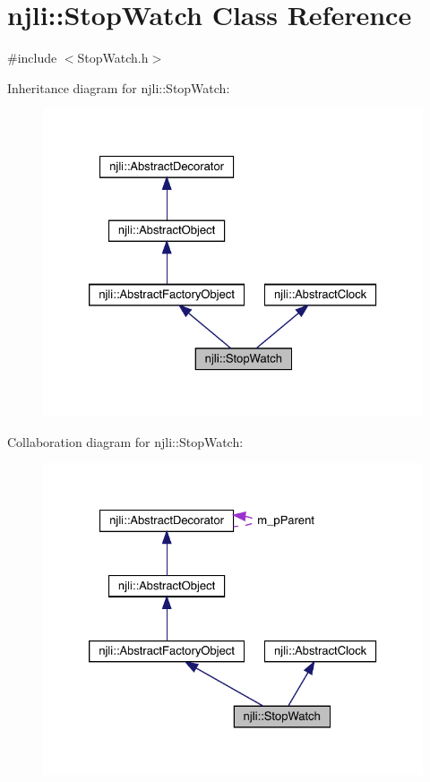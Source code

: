 \hypertarget{classnjli_1_1_stop_watch}{}\section{njli\+:\+:Stop\+Watch Class Reference}
\label{classnjli_1_1_stop_watch}


{\ttfamily \#include $<$Stop\+Watch.\+h$>$}



Inheritance diagram for njli\+:\+:Stop\+Watch\+:\nopagebreak
\begin{figure}[H]
\begin{center}
\leavevmode
\includegraphics[width=326pt]{classnjli_1_1_stop_watch__inherit__graph}
\end{center}
\end{figure}


Collaboration diagram for njli\+:\+:Stop\+Watch\+:\nopagebreak
\begin{figure}[H]
\begin{center}
\leavevmode
\includegraphics[width=326pt]{classnjli_1_1_stop_watch__coll__graph}
\end{center}
\end{figure}
